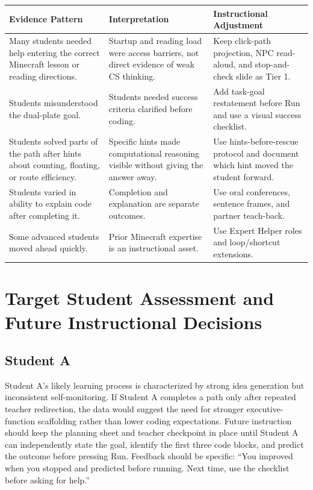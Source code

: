\documentclass[12pt]{article}
\newcommand{\arow}{\rowcolor{altRow}}
\begin{document}
\begin{assessbox}
\begin{tabularx}{\textwidth}{|P{1.7in}|P{2.2in}|L|}
\hline
{}\color{white}\bfseries Evidence Pattern & \color{white}\bfseries Interpretation & \color{white}\bfseries Instructional Adjustment \\
\hline
Many students needed help entering the correct Minecraft lesson or reading directions. & Startup and reading load were access barriers, not direct evidence of weak CS thinking. & Keep click-path projection, NPC read-aloud, and stop-and-check slide as Tier 1. \\
\hline
\arow Students misunderstood the dual-plate goal. & Students needed success criteria clarified before coding. & Add task-goal restatement before Run and use a visual success checklist. \\
\hline
Students solved parts of the path after hints about counting, floating, or route efficiency. & Specific hints made computational reasoning visible without giving the answer away. & Use hints-before-rescue protocol and document which hint moved the student forward. \\
\hline
\arow Students varied in ability to explain code after completing it. & Completion and explanation are separate outcomes. & Use oral conferences, sentence frames, and partner teach-back. \\
\hline
Some advanced students moved ahead quickly. & Prior Minecraft expertise is an instructional asset. & Use Expert Helper roles and loop/shortcut extensions. \\
\hline
\end{tabularx}
\end{assessbox}

\section{Target Student Assessment and Future Instructional Decisions}
\subsection{Student A}
Student A's likely learning process is characterized by strong idea generation but inconsistent self-monitoring. If Student A completes a path only after repeated teacher redirection, the data would suggest the need for stronger executive-function scaffolding rather than lower coding expectations. Future instruction should keep the planning sheet and teacher checkpoint in place until Student A can independently state the goal, identify the first three code blocks, and predict the outcome before pressing Run. Feedback should be specific: ``You improved when you stopped and predicted before running. Next time, use the checklist before asking for help.''
\end{document}
